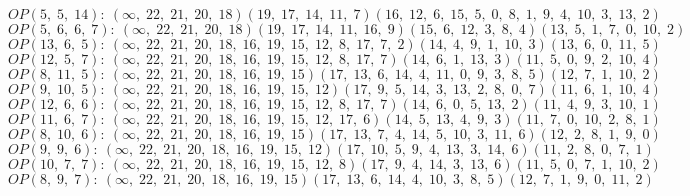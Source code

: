 $OP(5, \;5, \;14): \:(\infty, \;22, \;21, \;20, \;18)(19, \;17, \;14, \;11, \;7)(16, \;12, \;6, \;15, \;5, \;0, \;8, \;1, \;9, \;4, \;10, \;3, \;13, \;2)$\\
$OP(5, \;6, \;6, \;7): \:(\infty, \;22, \;21, \;20, \;18)(19, \;17, \;14, \;11, \;16, \;9)(15, \;6, \;12, \;3, \;8, \;4)(13, \;5, \;1, \;7, \;0, \;10, \;2)$\\
$OP(13, \;6, \;5): \:(\infty, \;22, \;21, \;20, \;18, \;16, \;19, \;15, \;12, \;8, \;17, \;7, \;2)(14, \;4, \;9, \;1, \;10, \;3)(13, \;6, \;0, \;11, \;5)$\\
$OP(12, \;5, \;7): \:(\infty, \;22, \;21, \;20, \;18, \;16, \;19, \;15, \;12, \;8, \;17, \;7)(14, \;6, \;1, \;13, \;3)(11, \;5, \;0, \;9, \;2, \;10, \;4)$\\
$OP(8, \;11, \;5): \:(\infty, \;22, \;21, \;20, \;18, \;16, \;19, \;15)(17, \;13, \;6, \;14, \;4, \;11, \;0, \;9, \;3, \;8, \;5)(12, \;7, \;1, \;10, \;2)$\\
$OP(9, \;10, \;5): \:(\infty, \;22, \;21, \;20, \;18, \;16, \;19, \;15, \;12)(17, \;9, \;5, \;14, \;3, \;13, \;2, \;8, \;0, \;7)(11, \;6, \;1, \;10, \;4)$\\
$OP(12, \;6, \;6): \:(\infty, \;22, \;21, \;20, \;18, \;16, \;19, \;15, \;12, \;8, \;17, \;7)(14, \;6, \;0, \;5, \;13, \;2)(11, \;4, \;9, \;3, \;10, \;1)$\\
$OP(11, \;6, \;7): \:(\infty, \;22, \;21, \;20, \;18, \;16, \;19, \;15, \;12, \;17, \;6)(14, \;5, \;13, \;4, \;9, \;3)(11, \;7, \;0, \;10, \;2, \;8, \;1)$\\
$OP(8, \;10, \;6): \:(\infty, \;22, \;21, \;20, \;18, \;16, \;19, \;15)(17, \;13, \;7, \;4, \;14, \;5, \;10, \;3, \;11, \;6)(12, \;2, \;8, \;1, \;9, \;0)$\\
$OP(9, \;9, \;6): \:(\infty, \;22, \;21, \;20, \;18, \;16, \;19, \;15, \;12)(17, \;10, \;5, \;9, \;4, \;13, \;3, \;14, \;6)(11, \;2, \;8, \;0, \;7, \;1)$\\
$OP(10, \;7, \;7): \:(\infty, \;22, \;21, \;20, \;18, \;16, \;19, \;15, \;12, \;8)(17, \;9, \;4, \;14, \;3, \;13, \;6)(11, \;5, \;0, \;7, \;1, \;10, \;2)$\\
$OP(8, \;9, \;7): \:(\infty, \;22, \;21, \;20, \;18, \;16, \;19, \;15)(17, \;13, \;6, \;14, \;4, \;10, \;3, \;8, \;5)(12, \;7, \;1, \;9, \;0, \;11, \;2)$\\

